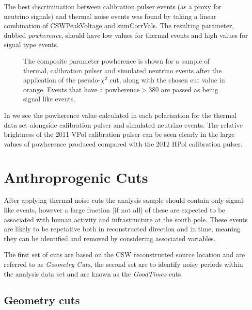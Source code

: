 The best discrimination between calibration pulser events (as a proxy for neutrino signals) and thermal noise events was found by taking a linear combination of CSWPeakVoltage and sumCorrVals. The resulting parameter, dubbed \textit{powherence}, should have low values for thermal events and high values for signal type events.


\begin{figure}[htpb]
  \hfill
  \caption{The composite parameter powherence is shown for a sample of thermal, calibration pulser and simulated neutrino events after the application of the pseudo-$\chi^{2}$ cut, along with the chosen cut value in orange. Events that have a $\mbox{powherence} > 380$ are passed as being signal like events.}
  \label{fig:Analysis:Thermal-Cuts:Powherence}
\end{figure}

In  we see the powherence value calculated in each polarisation for the thermal data set alongside calibration pulser and simulated neutrino events. The relative brightness of the 2011 VPol calibration pulser can be seen clearly in the large values of powherence produced compared with the 2012 HPol calibration pulser.


\section{Anthroprogenic Cuts}
\label{sec:Analysis:Anthroprogenic-Cuts}

After applying thermal noise cuts the analysis sample should contain only signal-like events, however a large fraction (if not all) of these are expected to be associated with human activity and infrastructure at the south pole. These events are likely to be repetative both in reconstructed direction and in time, meaning they can be identified and removed by considering associated variables.

The first set of cuts are based on the CSW reconstructed source location and are referred to as \textit{Geometry Cuts}, the second set are to identify noisy periods within the analysis data set and are known as the \textit{GoodTimes} cuts.

\subsection{Geometry cuts}
\label{sec:Analysis:Anthroprogenic-Cuts:Geometry-Cuts}

